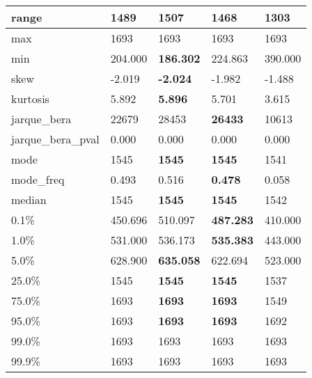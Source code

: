 \begin{table}[H]
\begin{tabular}{|l|m{10em}|m{10em}|m{10em}|m{10em}|}
\hline range & 1489 & \bfseries 1507 & 1468 & \cellcolor[rgb]{0.9, 0.54, 0.52} 1303 \\
\hline max & 1693 & 1693 & 1693 & 1693 \\
\hline min & 204.000 & \bfseries 186.302 & 224.863 & \cellcolor[rgb]{0.9, 0.54, 0.52} 390.000 \\
\hline skew & -2.019 & \bfseries -2.024 & -1.982 & \cellcolor[rgb]{0.9, 0.54, 0.52} -1.488 \\
\hline kurtosis & 5.892 & \bfseries 5.896 & 5.701 & \cellcolor[rgb]{0.9, 0.54, 0.52} 3.615 \\
\hline jarque\_bera & 22679 & 28453 & \bfseries 26433 & \cellcolor[rgb]{0.9, 0.54, 0.52} 10613 \\
\hline jarque\_bera\_pval & 0.000 & 0.000 & 0.000 & 0.000 \\
\hline mode & 1545 & \bfseries 1545 & \bfseries 1545 & \cellcolor[rgb]{0.9, 0.54, 0.52} 1541 \\
\hline mode\_freq & 0.493 & 0.516 & \bfseries 0.478 & \cellcolor[rgb]{0.9, 0.54, 0.52} 0.058 \\
\hline median & 1545 & \bfseries 1545 & \bfseries 1545 & \cellcolor[rgb]{0.9, 0.54, 0.52} 1542 \\
\hline 0.1\% & 450.696 & \cellcolor[rgb]{0.9, 0.54, 0.52} 510.097 & \bfseries 487.283 & 410.000 \\
\hline 1.0\% & 531.000 & 536.173 & \bfseries 535.383 & \cellcolor[rgb]{0.9, 0.54, 0.52} 443.000 \\
\hline 5.0\% & 628.900 & \bfseries 635.058 & 622.694 & \cellcolor[rgb]{0.9, 0.54, 0.52} 523.000 \\
\hline 25.0\% & 1545 & \bfseries 1545 & \bfseries 1545 & \cellcolor[rgb]{0.9, 0.54, 0.52} 1537 \\
\hline 75.0\% & 1693 & \bfseries 1693 & \bfseries 1693 & \cellcolor[rgb]{0.9, 0.54, 0.52} 1549 \\
\hline 95.0\% & 1693 & \bfseries 1693 & \bfseries 1693 & \cellcolor[rgb]{0.9, 0.54, 0.52} 1692 \\
\hline 99.0\% & 1693 & 1693 & 1693 & 1693 \\
\hline 99.9\% & 1693 & 1693 & 1693 & 1693 \\
\hline
\end{tabular}
\end{table}
